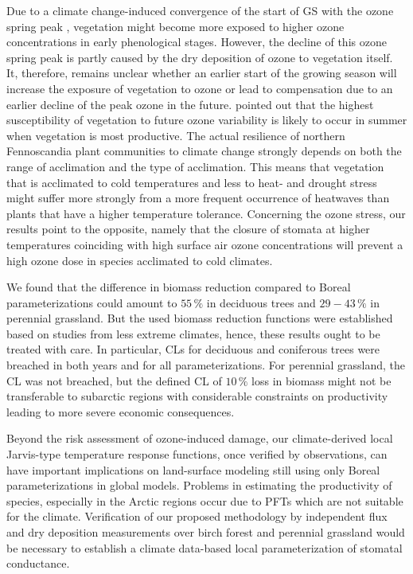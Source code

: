 \documentclass[bg, manuscript]{copernicus}
\begin{document}
Due to a climate change-induced convergence of the start of GS with the ozone spring peak \citep{EP:Karlsson2007}, vegetation might become more exposed to higher ozone concentrations in early phenological stages. However, the decline of this ozone spring peak is partly caused by the dry deposition of ozone to vegetation itself. It, therefore, remains unclear whether an earlier start of the growing season will increase the exposure of vegetation to ozone or lead to compensation due to an earlier decline of the peak ozone in the future. \citet{ESPR:Hayes2021} pointed out that the highest susceptibility of vegetation to future ozone variability is likely to occur in summer when vegetation is most productive. The actual resilience of northern Fennoscandia plant communities to climate change strongly depends on both the range of acclimation and the type of acclimation. This means that vegetation that is acclimated to cold temperatures and less to heat- and drought stress might suffer more strongly from a more frequent occurrence of heatwaves than plants that have a higher temperature tolerance. Concerning the ozone stress, our results point to the opposite, namely that the closure of stomata at higher temperatures coinciding with high surface air ozone concentrations will prevent a high ozone dose in species acclimated to cold climates.

We found that the difference in biomass reduction compared to Boreal parameterizations \citep{ICP:MappingManual2017} could amount to $55\,\unit{\%}$ in deciduous trees and $29-43\,\unit{\%}$ in perennial grassland. But the used biomass reduction functions were established based on studies from less extreme climates, hence, these results ought to be treated with care. In particular, CLs for deciduous and coniferous trees were breached in both years and for all parameterizations. For perennial grassland, the CL was not breached, but the defined CL of $10\,\unit{\%}$ loss in biomass might not be transferable to subarctic regions with considerable constraints on productivity leading to more severe economic consequences.

Beyond the risk assessment of ozone-induced damage, our climate-derived local Jarvis-type temperature response functions, once verified by observations, can have important implications on land-surface modeling still using only Boreal parameterizations in global models. Problems in estimating the productivity of species, especially in the Arctic regions occur due to PFTs which are not suitable for the climate. Verification of our proposed methodology by independent flux and dry deposition measurements over birch forest and perennial grassland would be necessary to establish a climate data-based local parameterization of stomatal conductance.
\end{document}
